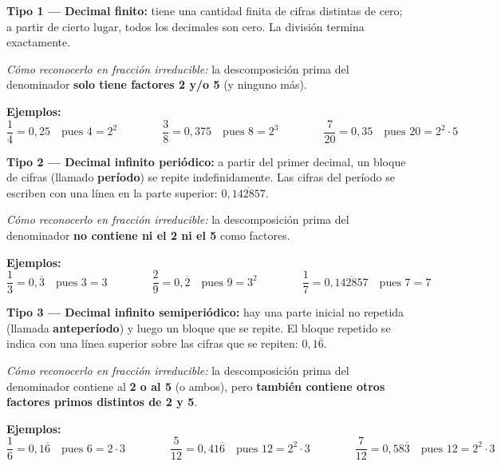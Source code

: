 \documentclass[11pt, letterpaper]{article}
\begin{document}
\begin{tcolorbox}[importantbox, title={Tipos de representaci\'on decimal de un racional}]
\noindent\textbf{Tipo 1 --- Decimal finito:} tiene una cantidad finita de cifras distintas de cero; a partir de cierto lugar, todos los decimales son cero. La divisi\'on termina exactamente.

\noindent\textit{C\'omo reconocerlo en fracci\'on irreducible:} la descomposici\'on prima del denominador \textbf{solo tiene factores 2 y/o 5} (y ninguno m\'as).

\medskip

\noindent\textbf{Ejemplos:}
$$\frac{1}{4} = 0{,}25 \quad\text{pues }4=2^2 \qquad\qquad \frac{3}{8} = 0{,}375 \quad\text{pues }8=2^3 \qquad\qquad \frac{7}{20} = 0{,}35 \quad\text{pues }20=2^2\cdot5$$

\medskip

\noindent\textbf{Tipo 2 --- Decimal infinito peri\'odico:} a partir del primer decimal, un bloque de cifras (llamado \textbf{per\'iodo}) se repite indefinidamente. Las cifras del per\'iodo se escriben con una l\'inea en la parte superior: $0{,}\overline{142857}$.

\noindent\textit{C\'omo reconocerlo en fracci\'on irreducible:} la descomposici\'on prima del denominador \textbf{no contiene ni el 2 ni el 5} como factores.

\medskip

\noindent\textbf{Ejemplos:}
$$\frac{1}{3} = 0{,}\overline{3} \quad\text{pues }3=3 \qquad\qquad \frac{2}{9} = 0{,}\overline{2} \quad\text{pues }9=3^2 \qquad\qquad \frac{1}{7} = 0{,}\overline{142857} \quad\text{pues }7=7$$

\medskip

\noindent\textbf{Tipo 3 --- Decimal infinito semiperiódi\-co:} hay una parte inicial no repetida (llamada \textbf{anteper\'iodo}) y luego un bloque que se repite. El bloque repetido se indica con una l\'inea superior sobre las cifras que se repiten: $0{,}1\overline{6}$.

\noindent\textit{C\'omo reconocerlo en fracci\'on irreducible:} la descomposici\'on prima del denominador contiene al \textbf{2 o al 5} (o ambos), pero \textbf{tambi\'en contiene otros factores primos distintos de 2 y 5}.

\medskip

\noindent\textbf{Ejemplos:}
$$\frac{1}{6} = 0{,}1\overline{6} \quad\text{pues }6=2\cdot3 \qquad\qquad \frac{5}{12} = 0{,}41\overline{6} \quad\text{pues }12=2^2\cdot3 \qquad\qquad \frac{7}{12} = 0{,}58\overline{3} \quad\text{pues }12=2^2\cdot3$$
\end{tcolorbox}
\end{document}
